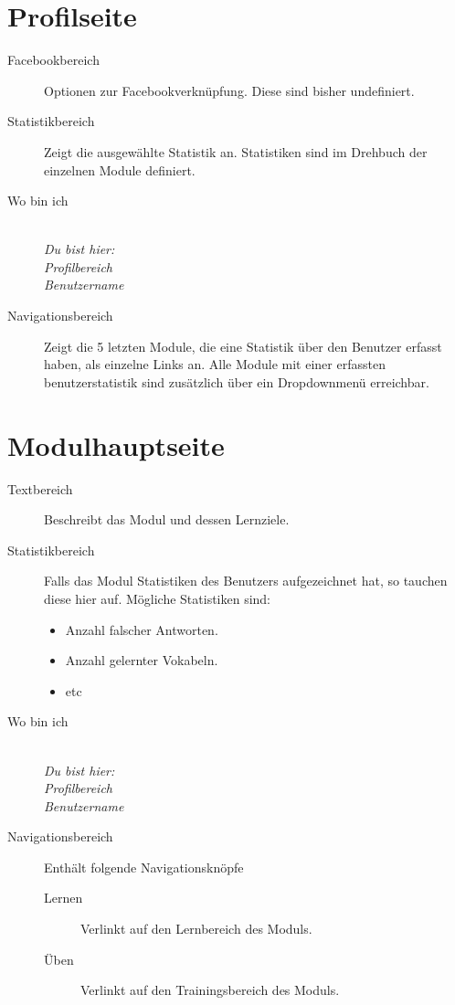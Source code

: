 %
%
%
\section{Profilseite}
\label{sec:profile-page}

\begin{description}
  \item[Facebookbereich] Optionen zur Facebookverknüpfung. Diese sind bisher undefiniert.
  \item[Statistikbereich] Zeigt die ausgewählte Statistik an. Statistiken sind im Drehbuch der einzelnen Module definiert.
  \item[Wo bin ich] \emph{\\Du bist hier:\\Profilbereich\\Benutzername}
  \item[Navigationsbereich] Zeigt die 5 letzten Module, die eine Statistik über den Benutzer erfasst haben, als einzelne 	Links an. Alle Module mit einer erfassten benutzerstatistik sind zusätzlich über ein Dropdownmenü 	erreichbar.
\end{description}




%
%
%
\section{Modulhauptseite}
\label{sec:module-main-page}

\begin{description}
  \item[Textbereich] Beschreibt das Modul und dessen Lernziele.
  \item[Statistikbereich] 
    Falls das Modul Statistiken des Benutzers aufgezeichnet hat, so tauchen diese hier auf. Mögliche Statistiken sind:
    \begin{itemize}
      \item Anzahl falscher Antworten.
      \item Anzahl gelernter Vokabeln.
      \item etc
    \end{itemize}
  \item[Wo bin ich] 
    \emph{\\Du bist hier:\\Profilbereich\\Benutzername}
  \item[Navigationsbereich] Enthält folgende Navigationsknöpfe
   \begin{description}
    \item[Lernen] Verlinkt auf den Lernbereich des Moduls.
    \item[Üben] Verlinkt auf den Trainingsbereich des Moduls.
   \end{description}
\end{description}


